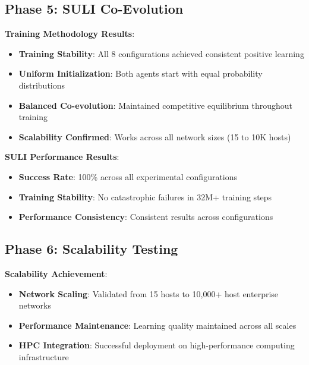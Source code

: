 \documentclass[11pt]{article}
\begin{document}
\begin{intuition}
\subsection{Phase 5: SULI Co-Evolution}
\begin{example}
\textbf{Training Methodology Results}:
\begin{itemize}
\item \textbf{Training Stability}: All 8 configurations achieved consistent positive learning
\item \textbf{Uniform Initialization}: Both agents start with equal probability distributions
\item \textbf{Balanced Co-evolution}: Maintained competitive equilibrium throughout training
\item \textbf{Scalability Confirmed}: Works across all network sizes (15 to 10K hosts)
\end{itemize}
\end{example}

\begin{mathdetails}
\textbf{SULI Performance Results}:
\begin{itemize}
\item \textbf{Success Rate}: 100\% across all experimental configurations
\item \textbf{Training Stability}: No catastrophic failures in 32M+ training steps
\item \textbf{Performance Consistency}: Consistent results across configurations
\end{itemize}
\end{mathdetails}


\subsection{Phase 6: Scalability Testing}
\begin{example}
\textbf{Scalability Achievement}:
\begin{itemize}
\item \textbf{Network Scaling}: Validated from 15 hosts to 10,000+ host enterprise networks
\item \textbf{Performance Maintenance}: Learning quality maintained across all scales
\item \textbf{HPC Integration}: Successful deployment on high-performance computing infrastructure
\end{itemize}
\end{example}


\end{intuition}
\end{document}
